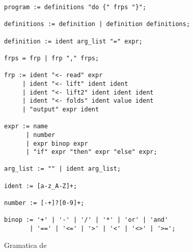 \begin{figure}[h!]
  \begin{center}
    \caption{Gramatica de \frob{}}
    \begin{Verbatim}[frame=single]
program := definitions "do {" frps "}";

definitions := definition | definition definitions;

definition := ident arg_list "=" expr;

frps = frp | frp "," frps;

frp := ident "<- read" expr
     | ident "<- lift" ident ident
     | ident "<- lift2" ident ident ident
     | ident "<- folds" ident value ident
     | "output" expr ident

expr := name
      | number
      | expr binop expr
      | "if" expr "then" expr "else" expr;

arg_list := "" | ident arg_list;

ident := [a-z_A-Z]+;

number := [-+]?[0-9]+;

binop := '+' | '-' | '/' | '*' | 'or' | 'and'
       | '==' | '<=' | '>' | '<' | '<>' | '>=';
     \end{Verbatim}
   \label{fig:grammar}
   \end{center}
 \end{figure}
